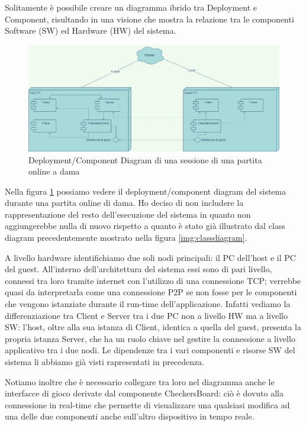 \documentclass[12pt]{article}
\begin{document}
Solitamente è possibile creare un diagramma ibrido tra Deployment e Component, risultando in una visione che mostra la relazione tra le componenti Software (SW) ed Hardware (HW) del sistema.

\begin{figure}[H]
\centering
\includegraphics[scale=.35]{Deployment_Component}
\caption{Deployment/Component Diagram di una sessione di una partita online a dama}
\label{img:dcdiagram}
\end{figure}

Nella figura \ref{img:dcdiagram} possiamo vedere il deployment/component diagram del sistema durante una partita online di dama. Ho deciso di non includere la rappresentazione del resto dell'esecuzione del sistema in quanto non aggiungerebbe nulla di nuovo rispetto a quanto è stato già illustrato dal class diagram precedentemente mostrato nella figura \ref{img:classdiagram}.

A livello hardware identifichiamo due soli nodi principali: il PC dell'host e il PC del guest. All'interno dell'architettura del sistema essi sono di pari livello, connessi tra loro tramite internet con l'utilizzo di una connessione TCP; verrebbe quasi da interpretarla come una connessione P2P se non fosse per le componenti che vengono istanziate durante il run-time dell'applicazione. Infatti vediamo la differenziazione tra Client e Server tra i due PC non a livello HW ma a livello SW: l'host, oltre alla sua istanza di Client, identica a quella del guest, presenta la propria istanza Server, che ha un ruolo chiave nel gestire la connessione a livello applicativo tra i due nodi. Le dipendenze tra i vari componenti e risorse SW del sistema li abbiamo già visti rapresentati in precedenza.

Notiamo inoltre che è necessario collegare tra loro nel diagramma anche le interfacce di gioco derivate dal componente CheckersBoard: ciò è dovuto alla connessione in real-time che permette di visualizzare una qualsiasi modifica ad una delle due componenti anche sull'altro dispositivo in tempo reale.
\end{document}
